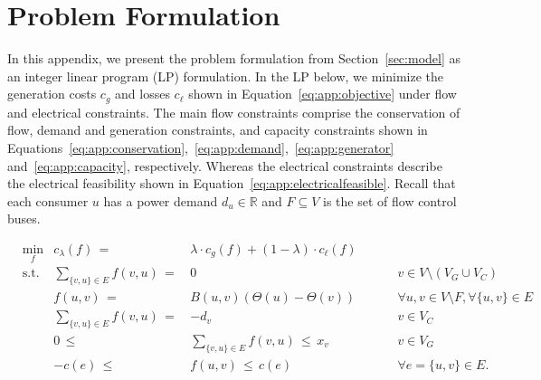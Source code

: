\documentclass{article}[11pt,a4paper]
\begin{document}
\section{Problem Formulation} \label{app:lp}
In this appendix, we present the problem formulation from Section~\ref{sec:model} as an integer linear program (LP) formulation. In the LP below, we minimize the generation costs $c_g$ and losses $c_\ell$ shown in Equation~\ref{eq:app:objective} under flow and electrical constraints. The main flow constraints comprise the conservation of flow, demand and generation constraints, and capacity constraints shown in Equations~\ref{eq:app:conservation},~\ref{eq:app:demand},~\ref{eq:app:generator} and~\ref{eq:app:capacity}, respectively. Whereas the electrical constraints describe the electrical feasibility shown in Equation~\ref{eq:app:electricalfeasible}. Recall that each consumer $u$ has a power demand $d_u\in\mathbb{R}$ and $F\subseteq V$ is the set of flow control buses.
\begin{figure*}[b!]
\centering
\begin{align}
& \underset{f}{\text{min}}
& c_\lambda(f)\,=\, & \lambda \cdot c_g(f) + (1-\lambda)\cdot c_\ell(f)\label{eq:app:objective}\\
& \text{s.t.}
& \sum_{\{v,u\} \in E} f(v,u)\,=\,&  0 & & & & v \in V\setminus (V_G \cup V_C)\label{eq:app:conservation}\\
& & f(u,v)\,=\,& B(u,v) (\Theta(u) - \Theta(v)) & & & & \forall u,v\in V\setminus F, \forall\{u,v\}\in E\label{eq:app:electricalfeasible}\\
& & \sum_{\{v,u\} \in E} f(v,u)\,=\,&   -d_v & & & & v \in V_C\label{eq:app:demand}\\
& & 0\,\le\,&\sum_{\{v,u\} \in E} f(v,u) \,\le\,x_v & & & & v \in V_G\label{eq:app:generator}\\
& & -c(e)\,\le\,& f(u,v)\,\le\, c(e) & & & &\forall e=\{u,v\} \in E.\label{eq:app:capacity}
\end{align}
\end{figure*}
\end{document}
